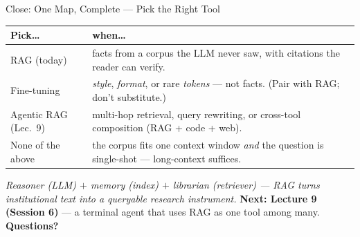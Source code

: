 \begin{frame}{Close: One Map, Complete --- Pick the Right Tool}

\vspace{-0.38cm}
\begin{center}
\scriptsize
\renewcommand{\arraystretch}{1.0}
\begin{tabular}{@{}p{2.5cm}p{8.7cm}@{}}
\toprule
\textbf{Pick\dots} & \textbf{when\dots} \\
\midrule
RAG (today) & facts from a corpus the LLM never saw, with citations the reader can verify. \\
Fine-tuning & \emph{style}, \emph{format}, or rare \emph{tokens} --- not facts. (Pair with RAG; don't substitute.) \\
Agentic RAG (Lec.\ 9) & multi-hop retrieval, query rewriting, or cross-tool composition (RAG + code + web). \\
None of the above & the corpus fits one context window \emph{and} the question is single-shot --- long-context suffices. \\
\bottomrule
\end{tabular}
\end{center}

\vspace{0.04cm}
{\centering\scriptsize\emph{Reasoner (LLM) $+$ memory (index) $+$ librarian (retriever) --- RAG turns institutional text into a queryable research instrument.} \textbf{Next: Lecture 9 (Session 6)} --- a terminal agent that uses RAG as one tool among many. \textbf{Questions?}\par}
\end{frame}


